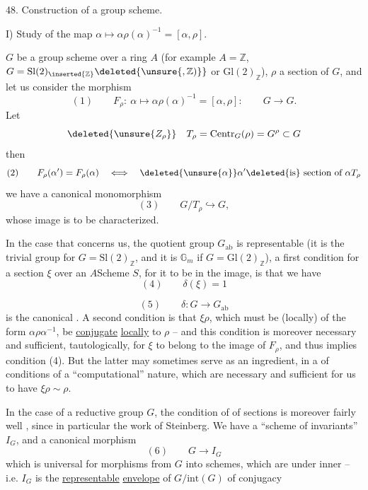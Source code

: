 
48. Construction of a group scheme.

I) Study of the map $\alpha\longmapsto
\alpha\rho(\alpha)^{-1}=[\alpha,\rho]$.

 $G$ be a group scheme over a ring
$A$ (for example $A=\mathbb Z$, $G=\mathrm{Sl}(2)_{\inserted{\mathbb Z}}
\deleted{\unsure{,\mathbb Z)}}$ or $\mathrm{Gl}(2)_{\mathbb Z}$),
$\rho$ a section of $G$, and let us consider the morphism
\[
(1)\qquad
F_\rho:\ \alpha\longmapsto\alpha\rho(\alpha)^{-1}
=[\alpha,\rho]:\qquad G\longrightarrow G.
\]
Let
\[
\deleted{\unsure{Z_\rho}}\quad
T_\rho
=\mathrm{Centr}_G(\rho)=G^\rho\subset G
\]
then
\[
(2)\qquad
F_\rho(\alpha')=F_\rho(\alpha)\quad\Longleftrightarrow\quad
\deleted{\unsure{\alpha}}\alpha'\deleted{\text{is}}
\text{ section of }\alpha T_\rho
\]
 we have a canonical monomorphism
\[
(3)\qquad
G/T_\rho\hookrightarrow G,
\]
whose image is to be characterized.

In the case that concerns us, the quotient group $G_{\mathrm{ab}}$
is representable (it is the trivial group for
$G=\mathrm{Sl}(2)_{\mathbb Z}$, and it is $\mathbb G_m$ if
$G=\mathrm{Gl}(2)_{\mathbb Z}$),
 a first condition for
a section $\xi$
over an $A$Scheme $S$,  for it
to be in the image, is that we have
\[
(4)\qquad\delta(\xi)=1
\]

\[
(5)\qquad \delta:G\longrightarrow G_{\mathrm{ab}}
\]
is the canonical . A second condition is that $\xi\rho$, which must be (locally) of the form $\alpha\rho\alpha^{-1}$, be \uline{conjugate} \uline{locally} to $\rho$ -- and this condition is moreover necessary and sufficient, tautologically, for $\xi$ to belong to the image of $F_\rho$, and thus implies condition (4). But the latter may sometimes serve as an ingredient,  in a  of conditions of a ``computational'' nature, which are necessary and sufficient for us to have $\xi\rho\sim\rho$.

In the case of a reductive group $G$, the condition of   of sections is moreover fairly well , since in particular the work of Steinberg. We have a ``scheme of invariants'' $I_G$, and a canonical morphism
\[
(6)\qquad G\longrightarrow I_G
\]
\unsure{(}which is universal  for morphisms from $G$ into schemes, which are  under inner  -- i.e. $I_G$ is the \uline{representable} \uline{envelope} of $G/\mathrm{int}(G)$  of conjugacy

